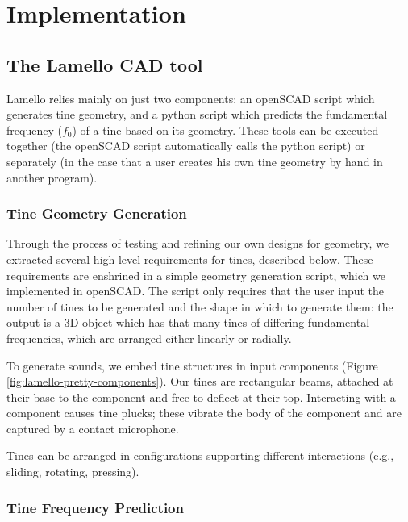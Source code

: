     
\section{Implementation}

    \subsection{The Lamello CAD tool}
    
    Lamello relies mainly on just two components: an openSCAD script which generates tine geometry, and a python script which predicts the fundamental frequency ($f_0$) of a tine based on its geometry. These tools can be executed together (the openSCAD script automatically calls the python script) or separately (in the case that a user creates his own tine geometry by hand in another program).
    
        \subsubsection{Tine Geometry Generation}
    
        Through the process of testing and refining our own designs for geometry, we extracted several high-level requirements for tines, described below. These requirements are enshrined in a simple geometry generation script, which we implemented in openSCAD. The script only requires that the user input the number of tines to be generated and the shape in which to generate them: the output is a 3D object which has that many tines of differing fundamental frequencies, which are arranged either linearly or radially. 

        To generate sounds, we embed tine structures in input components (Figure \ref{fig:lamello-pretty-components}). Our tines are rectangular beams, attached at their base to the component and free to deflect at their top. Interacting with a component causes tine plucks; these vibrate the body of the component and are captured by a contact microphone.
        
        Tines can be arranged in configurations supporting different interactions (e.g., sliding, rotating, pressing).
        
        \subsubsection{Tine Frequency Prediction}

